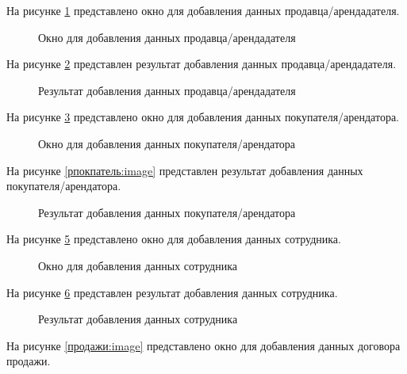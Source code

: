 На рисунке \ref{продавец:image} представлено окно для добавления данных продавца/арендадателя.

\begin{figure}[H]
	\caption{Окно для добавления данных продавца/арендадателя}
	\label{продавец:image}
\end{figure}

На рисунке \ref{РПродавец:image} представлен результат добавления данных продавца/арендадателя.

\begin{figure}[H]
	\caption{Результат добавления данных продавца/арендадателя}
	\label{РПродавец:image}
\end{figure}

На рисунке \ref{покупатель:image} представлено окно для добавления данных покупателя/арендатора.

\begin{figure}[H]
	\caption{Окно для добавления данных покупателя/арендатора}
	\label{покупатель:image}
\end{figure}

На рисунке \ref{рпокпатель:image} представлен результат добавления данных покупателя/арендатора.

\begin{figure}[H]
	\caption{Результат добавления данных покупателя/арендатора}
	\label{рпокупатель:image}
\end{figure}

На рисунке \ref{сотрудник:image} представлено окно для добавления данных сотрудника.

\begin{figure}[H]
	\caption{Окно для добавления данных сотрудника}
	\label{сотрудник:image}
\end{figure}

На рисунке \ref{рсотрудник:image} представлен результат добавления данных сотрудника.

\begin{figure}[H]
	\caption{Результат добавления данных сотрудника}
	\label{рсотрудник:image}
\end{figure}

На рисунке \ref{продажи:image} представлено окно для добавления данных договора продажи.

